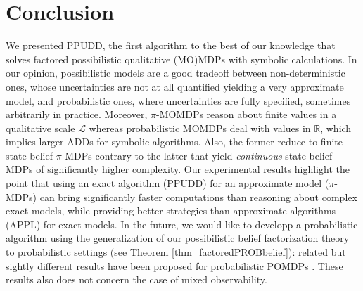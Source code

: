 \section{Conclusion} 
We presented PPUDD, the first algorithm to the best of our knowledge that 
solves factored possibilistic qualitative (MO)MDPs with symbolic calculations. In our opinion,
possibilistic models are a good tradeoff between non-deterministic ones, whose
uncertainties are not at all quantified yielding a very approximate model, and
probabilistic ones, where uncertainties are fully specified,
sometimes arbitrarily in practice. Moreover,
$\pi$-MOMDPs reason about finite values in a qualitative scale $\mathcal{L}$ whereas
probabilistic MOMDPs deal with values in $\mathbb{R}$, which implies larger ADDs
for symbolic algorithms. Also, the former reduce to finite-state belief
$\pi$-MDPs contrary to the latter that yield \emph{continuous}-state belief MDPs
of significantly higher complexity. Our experimental results highlight the point that using an
exact algorithm (PPUDD) for an approximate model ($\pi$-MDPs) can bring significantly faster computations
than reasoning about complex exact models, while providing better
strategies than approximate algorithms (APPL) for exact models. 
In the future, we would like to developp a probabilistic algorithm using 
the generalization of our possibilistic belief factorization theory to
probabilistic settings (see Theorem \ref{thm_factoredPROBbelief}): 
related but sightly different results have been proposed for
probabilistic POMDPs \cite{DBLP:conf/aips/ShaniPBS08}. 
These results also does not concern 
the case of mixed observability.


